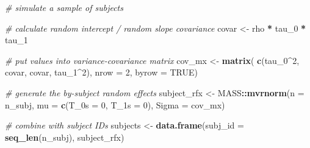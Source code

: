 \documentclass[english,doc,floatsintext]{apa6}
\newenvironment{Shaded}{\begin{snugshade}}{\end{snugshade}}
\newcommand{\CommentTok}[1]{\textcolor[rgb]{0.56,0.35,0.01}{\textit{#1}}}
\newcommand{\DataTypeTok}[1]{\textcolor[rgb]{0.13,0.29,0.53}{#1}}
\newcommand{\DecValTok}[1]{\textcolor[rgb]{0.00,0.00,0.81}{#1}}
\newcommand{\KeywordTok}[1]{\textcolor[rgb]{0.13,0.29,0.53}{\textbf{#1}}}
\newcommand{\NormalTok}[1]{#1}
\newcommand{\OperatorTok}[1]{\textcolor[rgb]{0.81,0.36,0.00}{\textbf{#1}}}
\newcommand{\OtherTok}[1]{\textcolor[rgb]{0.56,0.35,0.01}{#1}}
\newcommand{\StringTok}[1]{\textcolor[rgb]{0.31,0.60,0.02}{#1}}
\begin{document}
\begin{Shaded}
\begin{Highlighting}[]
\CommentTok{# simulate a sample of subjects}

\CommentTok{# calculate random intercept / random slope covariance}
\NormalTok{covar <-}\StringTok{ }\NormalTok{rho }\OperatorTok{*}\StringTok{ }\NormalTok{tau_}\DecValTok{0} \OperatorTok{*}\StringTok{ }\NormalTok{tau_}\DecValTok{1}

\CommentTok{# put values into variance-covariance matrix}
\NormalTok{cov_mx  <-}\StringTok{ }\KeywordTok{matrix}\NormalTok{(}
  \KeywordTok{c}\NormalTok{(tau_}\DecValTok{0}\OperatorTok{^}\DecValTok{2}\NormalTok{, covar,}
\NormalTok{    covar,   tau_}\DecValTok{1}\OperatorTok{^}\DecValTok{2}\NormalTok{),}
  \DataTypeTok{nrow =} \DecValTok{2}\NormalTok{, }\DataTypeTok{byrow =} \OtherTok{TRUE}\NormalTok{)}

\CommentTok{# generate the by-subject random effects}
\NormalTok{subject_rfx <-}\StringTok{ }\NormalTok{MASS}\OperatorTok{::}\KeywordTok{mvrnorm}\NormalTok{(}\DataTypeTok{n =}\NormalTok{ n_subj,}
                             \DataTypeTok{mu =} \KeywordTok{c}\NormalTok{(}\DataTypeTok{T_0s =} \DecValTok{0}\NormalTok{, }\DataTypeTok{T_1s =} \DecValTok{0}\NormalTok{),}
                             \DataTypeTok{Sigma =}\NormalTok{ cov_mx)}

\CommentTok{# combine with subject IDs}
\NormalTok{subjects <-}\StringTok{ }\KeywordTok{data.frame}\NormalTok{(}\DataTypeTok{subj_id =} \KeywordTok{seq_len}\NormalTok{(n_subj),}
\NormalTok{                       subject_rfx)}
\end{Highlighting}
\end{Shaded}
\end{document}
